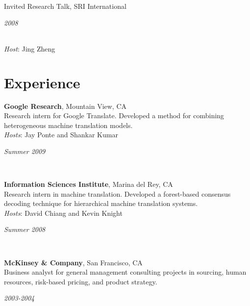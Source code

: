 \documentclass[margin,line]{res}
\newcommand{\dated}[2]{\parbox[t]{4.4in}{#1} \hspace{0.4in}
											 \parbox[t]{1in}{ {\it #2 } } }
\begin{document}
\begin{resume}
\dated{Invited Research Talk, SRI International}{2008} \\
{\em Host}: Jing Zheng

\section{\sc Experience}

\dated{ {\bf Google Research}, Mountain View, CA\\
Research intern for Google Translate.  Developed a method for combining
heterogeneous machine translation models. \\
{\em Hosts}: Jay Ponte and Shankar Kumar
}{Summer 2009} \\

\dated{ {\bf Information Sciences Institute}, Marina del Rey, CA \\
Research intern in machine translation. Developed a forest-based consensus
decoding technique for hierarchical machine translation systems. \\
{\em Hosts}: David Chiang and Kevin Knight}{Summer 2008} \\

\dated{ {\bf McKinsey \& Company}, San Francisco, CA \\
Business analyst for general management consulting projects in sourcing, human
resources, risk-based pricing, and product strategy.}{2003-2004}

\end{resume}
\end{document}
